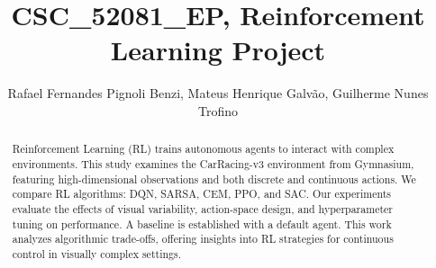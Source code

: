 \documentclass[journal, a4paper]{IEEEtran}
\begin{document}
\title{CSC\_52081\_EP, Reinforcement Learning Project}

\author{Rafael Fernandes Pignoli Benzi, Mateus Henrique Galvão, Guilherme Nunes Trofino}
\maketitle


\begin{abstract}
    Reinforcement Learning (RL) trains autonomous agents to interact with complex environments. This study examines the CarRacing-v3 environment from Gymnasium, featuring high-dimensional observations and both discrete and continuous actions. We compare RL algorithms: DQN, SARSA, CEM, PPO, and SAC. Our experiments evaluate the effects of visual variability, action-space design, and hyperparameter tuning on performance. A baseline is established with a default agent. This work analyzes algorithmic trade-offs, offering insights into RL strategies for continuous control in visually complex settings.
\end{abstract}







\end{document}
